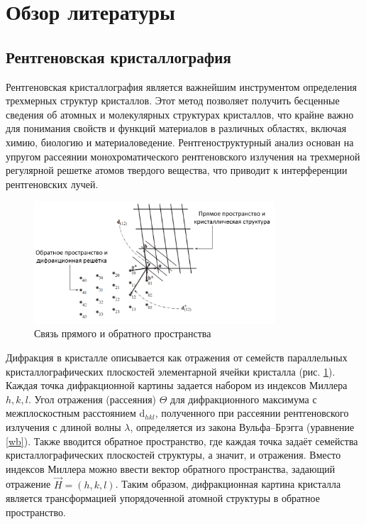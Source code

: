 \section{Обзор литературы}

\subsection{Рентгеновская кристаллография}


Рентгеновская кристаллография является важнейшим инструментом определения трехмерных структур кристаллов. Этот метод позволяет получить бесценные сведения об атомных и молекулярных структурах кристаллов, что крайне важно для понимания свойств и функций материалов в различных областях, включая химию, биологию и материаловедение. Рентгеноструктурный анализ основан на упругом рассеянии монохроматического рентгеновского излучения на трехмерной регулярной решетке атомов твердого вещества, что приводит к интерференции рентгеновских лучей.

\begin{figure}[H]
	\centering
	\includegraphics[width=0.8\textwidth]{figures/direct_reciprocal.png}\hfill
	\caption{Связь прямого и обратного пространства \cite{girolami_x-ray_2016}}
	\label{hkl}
\end{figure}

Дифракция в кристалле описывается как отражения от семейств параллельных кристаллографических плоскостей элементарной ячейки кристалла (рис. \ref{hkl}). Каждая точка дифракционной картины задается набором из индексов Миллера $h,k,l$. Угол отражения (рассеяния) $\Theta$ для дифракционного максимума с межплоскостным расстоянием d$_{hkl}$, полученного при рассеянии рентгеновского излучения с длиной волны $\lambda$, определяется из закона Вульфа--Брэгга (уравнение \ref{wb}). Также вводится обратное пространство, где каждая точка задаёт семейства кристаллографических плоскостей структуры, а значит, и отражения. Вместо индексов Миллера можно ввести вектор обратного пространства, задающий отражение $\overrightarrow{H} = (h,k,l)$. Таким образом, дифракционная картина кристалла является трансформацией упорядоченной атомной структуры в обратное пространство.

